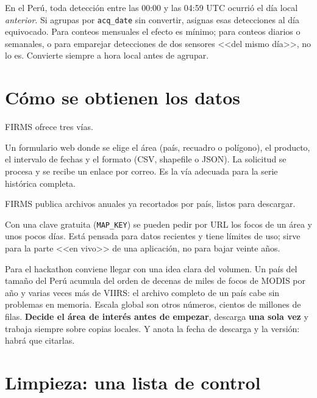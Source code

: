 \begin{atencion}
En el Perú, toda detección entre las 00:00 y las 04:59 UTC ocurrió el día local
\emph{anterior}. Si agrupas por \texttt{acq\_date} sin convertir, asignas esas detecciones al
día equivocado. Para conteos mensuales el efecto es mínimo; para conteos diarios o semanales, o
para emparejar detecciones de dos sensores <<del mismo día>>, no lo es. Convierte siempre a hora
local antes de agrupar.
\end{atencion}

\section{Cómo se obtienen los datos}

FIRMS ofrece tres vías.

\begin{description}[leftmargin=1.2em,style=nextline]
  \item[Descarga del archivo.] Un formulario web donde se elige el área (país, recuadro o
  polígono), el producto, el intervalo de fechas y el formato (CSV, shapefile o JSON). La
  solicitud se procesa y se recibe un enlace por correo. Es la vía adecuada para la serie
  histórica completa.
  \item[Archivos por país y por año.] FIRMS publica archivos anuales ya recortados por país,
  listos para descargar.
  \item[Interfaz de programación (API).] Con una clave gratuita (\texttt{MAP\_KEY}) se pueden
  pedir por URL los focos de un área y unos pocos días. Está pensada para datos recientes y
  tiene límites de uso; sirve para la parte <<en vivo>> de una aplicación, no para bajar veinte
  años.
\end{description}

\begin{parareto}
Para el hackathon conviene llegar con una idea clara del volumen. Un país del tamaño del Perú
acumula del orden de decenas de miles de focos de MODIS por año y varias veces más de VIIRS: el
archivo completo de un país cabe sin problemas en memoria. Escala global son otros números,
cientos de millones de filas. \textbf{Decide el área de interés antes de empezar}, descarga
\textbf{una sola vez} y trabaja siempre sobre copias locales. Y anota la fecha de descarga y la
versión: habrá que citarlas.
\end{parareto}

\section{Limpieza: una lista de control}

